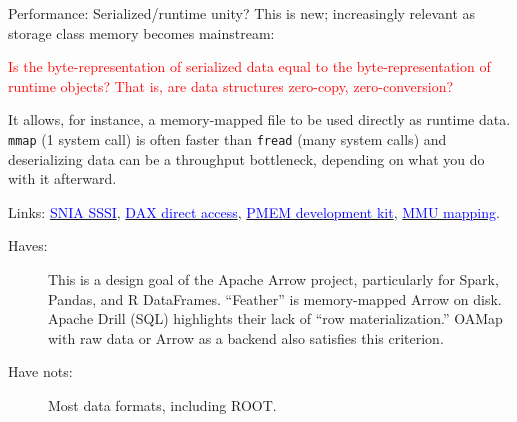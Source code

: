 \documentclass[aspectratio=169]{beamer}
\begin{document}
\begin{frame}{Performance: Serialized/runtime unity?}
\vspace{0.5 cm}
This is new; increasingly relevant as storage class memory becomes mainstream:

\begin{center}
\begin{minipage}{0.9\linewidth}
\textcolor{red}{Is the byte-representation of serialized data equal to the byte-representation of runtime objects? That is, are data structures zero-copy, zero-conversion?}
\end{minipage}
\end{center}

It allows, for instance, a memory-mapped file to be used directly as runtime data. {\tt\small mmap} (1 system call) is often faster than {\tt\small fread} (many system calls) and deserializing data can be a throughput bottleneck, depending on what you do with it afterward.

\vspace{0.25 cm}

Links: \href{https://www.snia.org/forums/sssi}{\textcolor{blue}{SNIA SSSI}}, \href{https://lwn.net/Articles/717953/}{\textcolor{blue}{DAX direct access}}, \href{https://pmem.io/}{\textcolor{blue}{PMEM development kit}}, \href{http://scitechconnect.elsevier.com/memory-management-unit/}{\textcolor{blue}{MMU mapping}}.

\vspace{0.15 cm}

\begin{description}
\item[Haves:] This is a design goal of the Apache Arrow project, particularly for Spark, Pandas, and R DataFrames. ``Feather'' is memory-mapped Arrow on disk. Apache Drill (SQL) highlights their lack of ``row materialization.'' OAMap with raw data or Arrow as a backend also satisfies this criterion.
\item[Have nots:] Most data formats, including ROOT.
\end{description}
\end{frame}
\end{document}
